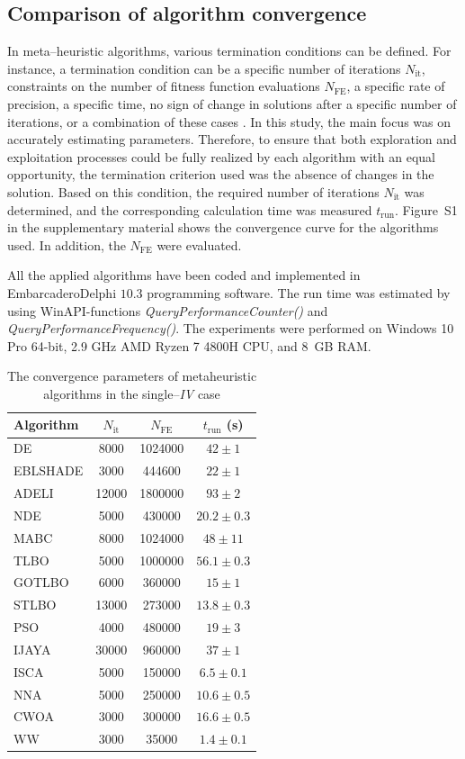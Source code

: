 \documentclass[a4paper,fleqn]{cas-sc}
\begin{document}
\subsection{Comparison of algorithm convergence}
In meta--heuristic algorithms, various termination conditions can be defined.
For instance, a termination condition can be a specific number of iterations $N_\mathrm{it}$,
constraints on the number of fitness function evaluations $N_\mathrm{FE}$,
a specific rate of precision,
a specific time,
no sign of change in solutions after a specific number of iterations,
or a combination of these cases \cite{IntelligentChaoticClonal}.
In this study, the main focus was on accurately estimating parameters.
Therefore, to ensure that both exploration and exploitation processes
could be fully realized by each algorithm with an equal opportunity,
the termination criterion used was the absence of changes in the solution.
Based on this condition, the required number of iterations $N_\mathrm{it}$ was determined,
and the corresponding calculation time was measured $t_\mathrm{run}$.
Figure~S1 in the supplementary material shows the convergence curve for the algorithms used.
In addition, the $N_\mathrm{FE}$ were evaluated.

All the applied algorithms have been coded and implemented in Embarcadero\textregistered Delphi $10.3$ programming software.
The run time was estimated by using WinAPI-functions \emph{QueryPerformanceCounter()} and \emph{QueryPerformanceFrequency()}.
The experiments were performed on Windows 10 Pro 64-bit,
2.9 GHz AMD Ryzen 7 4800H CPU, and 8~GB RAM.


\begin{table}[<options>]
\caption{The convergence parameters of metaheuristic algorithms in the single--\emph{IV} case}\label{tblRun}
\begin{tabular*}{\tblwidth}{@{}LCCC@{}}
\toprule
Algorithm  &  $N_\mathrm{it}$ & $N_\mathrm{FE}$ & $t_\mathrm{run}$ (s)\\ %
\midrule
DE & 8000& 1024000& $42\pm1$\\
EBLSHADE & 3000& 444600& $22\pm1$\\
ADELI & 12000& 1800000& $93\pm2$\\
NDE & 5000& 430000&$20.2\pm0.3$ \\
MABC & 8000& 1024000&$48\pm11$ \\
TLBO & 5000& 1000000&$56.1\pm0.3$ \\
GOTLBO & 6000& 360000&$15\pm1$ \\
STLBO & 13000& 273000&$13.8\pm0.3$ \\
PSO & 4000& 480000&$19\pm3$ \\
IJAYA & 30000& 960000&$37\pm1$ \\
ISCA & 5000& 150000&$6.5\pm0.1$ \\
NNA & 5000& 250000&$10.6\pm0.5$ \\
CWOA & 3000& 300000&$16.6\pm0.5$ \\
WW & 3000& 35000&$1.4\pm0.1$ \\
\bottomrule
\end{tabular*}
\end{table}
\end{document}
